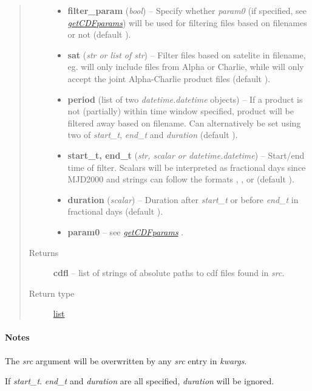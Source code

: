 \documentclass[letterpaper,10pt,english]{sphinxhowto}
\begin{document}
\begin{fulllineitems}
\begin{quote}
\begin{description}
\begin{itemize}
\item {} 
\textbf{filter\_param} (\emph{bool}) --
Specify whether \emph{param0} (if specified, see {\hyperref[swtools_doc:getcdfparams]{\emph{getCDFparams}}}) will
be used for filtering files based on filenames or not
(default ).

\item {} 
\textbf{sat} (\emph{str or list of str}) --
Filter files based on satelite in filename, eg.
 will only include files from Alpha or
Charlie, while  will only accept the joint
Alpha-Charlie product files (default ).

\item {} 
\textbf{period} (list of two \emph{datetime.datetime} objects) --
If a product is not (partially) within
time window specified, product will be filtered away based on
filename. Can alternatively be set using two of \emph{start\_t},
\emph{end\_t} and \emph{duration} (default ).

\item {} 
\textbf{start\_t, end\_t} (\emph{str, scalar or datetime.datetime}) --
Start/end time of filter. Scalars
will be interpreted as fractional days since MJD2000 and strings
can follow the formats , ,
 or  (default ).

\item {} 
\textbf{duration} (\emph{scalar}) --
Duration after \emph{start\_t} or before \emph{end\_t} in fractional days
(default ).

\item {} 
\textbf{param0} --
see {\hyperref[swtools_doc:getcdfparams]{\emph{getCDFparams}}} .

\end{itemize}

\item[{Returns}] \leavevmode
\textbf{cdfl} --
list of strings of absolute paths to cdf files found in \emph{src}.

\item[{Return type}] \leavevmode
\href{https://docs.python.org/library/functions.html\#list}{list}

\end{description}\end{quote}
\paragraph{Notes}

The \emph{src} argument will be overwritten by any \emph{src} entry in
\emph{kwargs}.

If \emph{start\_t}. \emph{end\_t} and \emph{duration} are all specified, \emph{duration}
will be ignored.

\end{fulllineitems}
\end{document}
